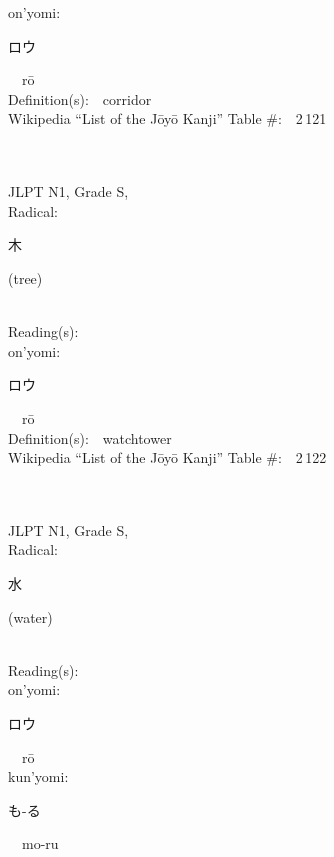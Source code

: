 \begin{multicols}{2}
{\hspace*{1em}}on'yomi:\ \ \\
{\hspace*{2em}}{\begin{CJK}{UTF8}{min} ロウ \end{CJK}}\ \ r\=o\ \ \\
Definition(s):\ \ corridor \\
Wikipedia ``List of the J\=oy\=o Kanji'' Table \#:\ \ 2\,121 \\
\ \ \\
{\fontsize{34pt}{40pt}  }\ \ \\
{JLPT N1, Grade S, \\Radical:\ \ {\begin{CJK}{UTF8}{min} 木 \end{CJK}} (tree) } \\
Reading(s):\ \ \\
{\hspace*{1em}}on'yomi:\ \ \\
{\hspace*{2em}}{\begin{CJK}{UTF8}{min} ロウ \end{CJK}}\ \ r\=o\ \ \\
Definition(s):\ \ watchtower \\
Wikipedia ``List of the J\=oy\=o Kanji'' Table \#:\ \ 2\,122 \\
\ \ \\
{\fontsize{34pt}{40pt}  }\ \ \\
{JLPT N1, Grade S, \\Radical:\ \ {\begin{CJK}{UTF8}{min} 水 \end{CJK}} (water) } \\
Reading(s):\ \ \\
{\hspace*{1em}}on'yomi:\ \ \\
{\hspace*{2em}}{\begin{CJK}{UTF8}{min} ロウ \end{CJK}}\ \ r\=o\ \ \\
{\hspace*{1em}}kun'yomi:\ \ \\
{\hspace*{2em}}{\begin{CJK}{UTF8}{min} も-る \end{CJK}}\ \ mo-ru\ \ \\

\end{multicols}
